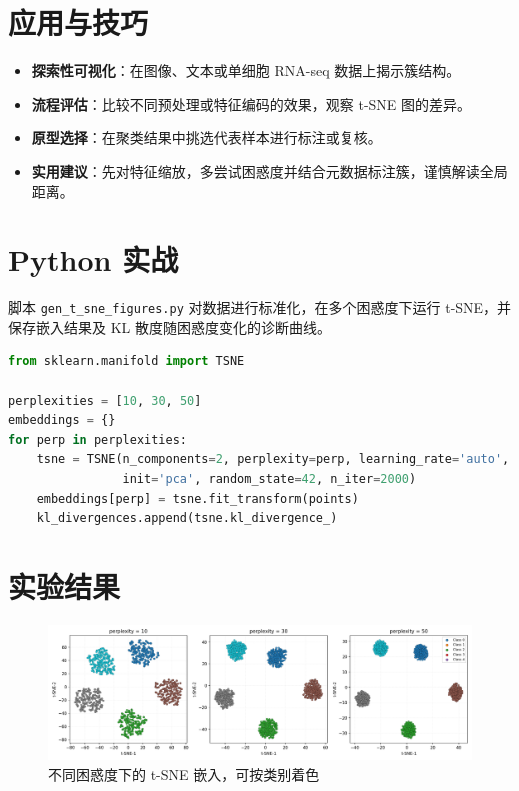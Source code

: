 \documentclass[UTF8,zihao=-4]{ctexart}
\begin{document}
\section{应用与技巧}
\begin{itemize}
  \item \textbf{探索性可视化}：在图像、文本或单细胞 RNA-seq 数据上揭示簇结构。
  \item \textbf{流程评估}：比较不同预处理或特征编码的效果，观察 t-SNE 图的差异。
  \item \textbf{原型选择}：在聚类结果中挑选代表样本进行标注或复核。
  \item \textbf{实用建议}：先对特征缩放，多尝试困惑度并结合元数据标注簇，谨慎解读全局距离。
\end{itemize}

\section{Python 实战}
脚本 \texttt{gen\_t\_sne\_figures.py} 对数据进行标准化，在多个困惑度下运行 t-SNE，并保存嵌入结果及 KL 散度随困惑度变化的诊断曲线。
\begin{lstlisting}[language=Python,caption={脚本 gen_t_sne_figures.py 片段}]
from sklearn.manifold import TSNE

perplexities = [10, 30, 50]
embeddings = {}
for perp in perplexities:
    tsne = TSNE(n_components=2, perplexity=perp, learning_rate='auto',
                init='pca', random_state=42, n_iter=2000)
    embeddings[perp] = tsne.fit_transform(points)
    kl_divergences.append(tsne.kl_divergence_)
\end{lstlisting}

\section{实验结果}
\begin{figure}[H]
  \centering
  \includegraphics[width=0.82\linewidth]{tsne_embeddings.png}
  \caption{不同困惑度下的 t-SNE 嵌入，可按类别着色}
  \label{fig:tsne_embeddings_cn}
\end{figure}
\end{document}
